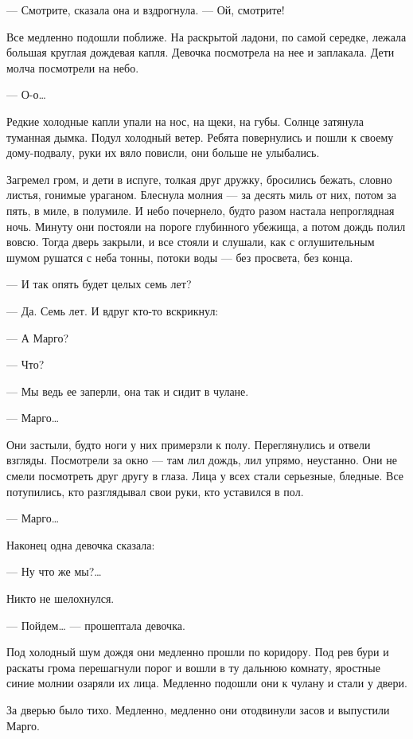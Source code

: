 — Смотрите, сказала она и вздрогнула. — Ой, смотрите!

Все медленно подошли поближе. На раскрытой ладони, по самой середке, лежала
большая круглая дождевая капля. Девочка посмотрела на нее и заплакала. Дети
молча посмотрели на небо.

— О-о…

Редкие холодные капли упали на нос, на щеки, на губы. Солнце затянула туманная
дымка. Подул холодный ветер. Ребята повернулись и пошли к своему дому-подвалу,
руки их вяло повисли, они больше не улыбались.

Загремел гром, и дети в испуге, толкая друг дружку, бросились бежать, словно
листья, гонимые ураганом. Блеснула молния — за десять миль от них, потом за
пять, в миле, в полумиле. И небо почернело, будто разом настала непроглядная
ночь. Минуту они постояли на пороге глубинного убежища, а потом дождь полил
вовсю. Тогда дверь закрыли, и все стояли и слушали, как с оглушительным шумом
рушатся с неба тонны, потоки воды — без просвета, без конца.

— И так опять будет целых семь лет?

— Да. Семь лет. И вдруг кто-то вскрикнул:

— А Марго?

— Что?

— Мы ведь ее заперли, она так и сидит в чулане.

— Марго…

Они застыли, будто ноги у них примерзли к полу. Переглянулись и отвели взгляды.
Посмотрели за окно — там лил дождь, лил упрямо, неустанно. Они не смели
посмотреть друг другу в глаза. Лица у всех стали серьезные, бледные. Все
потупились, кто разглядывал свои руки, кто уставился в пол.

— Марго…

Наконец одна девочка сказала:

— Ну что же мы?…

Никто не шелохнулся.

— Пойдем… — прошептала девочка.

Под холодный шум дождя они медленно прошли по коридору. Под рев бури и раскаты
грома перешагнули порог и вошли в ту дальнюю комнату, яростные синие молнии
озаряли их лица. Медленно подошли они к чулану и стали у двери.

За дверью было тихо. Медленно, медленно они отодвинули засов и выпустили Марго.
